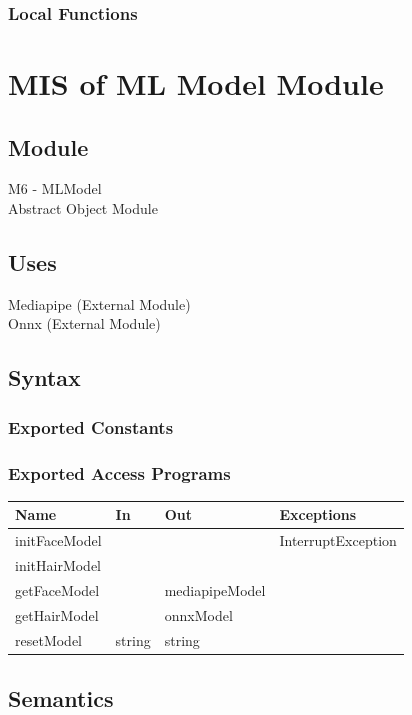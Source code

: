 \documentclass[12pt, titlepage]{article}
\begin{document}
\subsubsection{Local Functions}

\newpage
\section{MIS of ML Model Module}
\subsection{Module}
M6 - MLModel\\
Abstract Object Module

\subsection{Uses}
Mediapipe (External Module) \\
Onnx (External Module) \\

\subsection{Syntax}

\subsubsection{Exported Constants}

\subsubsection{Exported Access Programs}

\begin{center}
\begin{tabular}{p{4cm} p{3cm} p{4cm} p{4cm}}
\hline
\textbf{Name} & \textbf{In} & \textbf{Out} & \textbf{Exceptions} \\
\hline
initFaceModel & &  & InterruptException \\
initHairModel & &  &  \\
getFaceModel & & mediapipeModel & \\
getHairModel & & onnxModel & \\
resetModel & string & string & \\
\hline
\end{tabular}
\end{center}

\subsection{Semantics}
\end{document}
